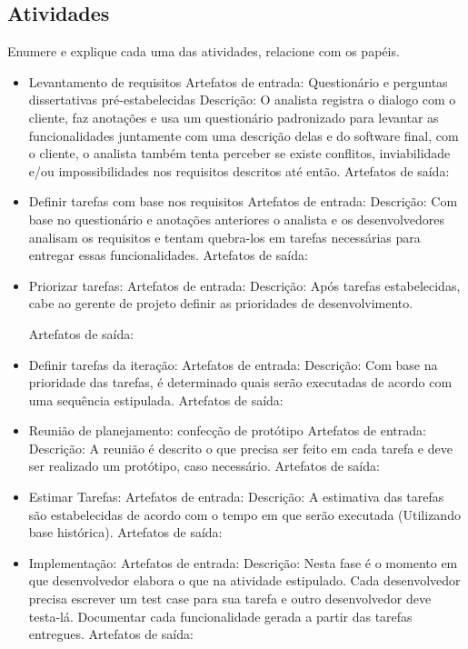\documentclass[	DIV=calc,%
							paper=a4,%
							fontsize=12pt,%
							onecolumn]{scrartcl}	 					%
\begin{document}
\subsection{Atividades}
Enumere e explique cada uma das atividades, relacione com os papéis.
\begin{itemize}
	\item Levantamento de requisitos
	\subitem Artefatos de entrada: Questionário e perguntas dissertativas pré-estabelecidas
	\subitem Descrição: O analista registra o dialogo com o cliente, faz anotações e usa um questionário padronizado para levantar as funcionalidades juntamente com uma descrição delas e do software final, com o cliente, o analista também tenta perceber se existe conflitos, inviabilidade e/ou impossibilidades nos requisitos descritos até então.
	\subitem Artefatos de saída:	
	\item Definir tarefas com base nos requisitos
	\subitem Artefatos de entrada:
	\subitem Descrição: Com base no questionário e anotações anteriores o analista e os desenvolvedores analisam os requisitos e tentam quebra-los em tarefas necessárias para entregar essas funcionalidades.
	\subitem Artefatos de saída:

	\item Priorizar tarefas: 
	\subitem Artefatos de entrada:
	\subitem Descrição: 
	Após tarefas estabelecidas, cabe ao gerente de projeto definir as prioridades de desenvolvimento.
	
	\subitem Artefatos de saída:

	\item Definir tarefas da iteração: 
	\subitem Artefatos de entrada:
	\subitem Descrição: Com base na prioridade das tarefas, é determinado quais serão executadas de acordo com uma sequência estipulada. 
	\subitem Artefatos de saída:
	
	\item Reunião de planejamento: confecção de protótipo
	\subitem Artefatos de entrada:
	\subitem Descrição: 
	A reunião é descrito o que precisa ser feito em cada tarefa e deve ser realizado um protótipo, caso necessário.
	\subitem Artefatos de saída:
	
	\item Estimar Tarefas:  
	\subitem Artefatos de entrada:
	\subitem Descrição: A estimativa das tarefas são estabelecidas de acordo com o tempo em que serão executada (Utilizando base histórica).
	\subitem Artefatos de saída:
	
	\item Implementação: 
	\subitem Artefatos de entrada:
	\subitem Descrição: Nesta fase é o momento em que desenvolvedor elabora o que na atividade estipulado. Cada desenvolvedor precisa escrever um test case para sua tarefa e outro desenvolvedor deve testa-lá. Documentar cada funcionalidade gerada a partir das tarefas entregues.
	\subitem Artefatos de saída:
	

\end{itemize}
\end{document}
